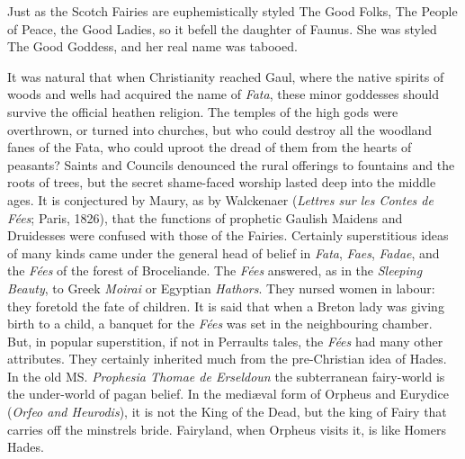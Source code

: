 \documentclass[14pt,a4paper]{memoir}
\begin{document}
{Just as the Scotch Fairies are euphemistically styled
\textquotesingle The Good Folks,\textquotesingle{} \textquotesingle The
People of Peace,\textquotesingle{} the \textquotesingle Good
Ladies,\textquotesingle{} so it befell the daughter of Faunus. She was
styled \textquotesingle The Good Goddess,\textquotesingle{} and her real
name was
tabooed.

It was natural that when Christianity reached Gaul, where the native
spirits of woods and wells had acquired the name of \emph{Fata}, these
minor goddesses should survive the official heathen religion. The
temples of the high gods were overthrown, or turned into churches, but
who could destroy all the woodland fanes of the Fata, who could uproot
the dread of them from the hearts of peasants? Saints and Councils
denounced the rural offerings to fountains and the roots of trees, but
the secret shame-faced worship lasted deep into the middle
ages.
It is conjectured by Maury, as by Walckenaer (\emph{Lettres sur les
Contes de Fées}; Paris, 1826), that the functions of prophetic Gaulish
Maidens and Druidesses were confused with those of the Fairies.
Certainly superstitious ideas of many kinds came under the general head
of belief in \emph{Fata}, \emph{Faes}, \emph{Fadae}, and the \emph{Fées}
of the forest of Broceliande. The \emph{Fées} answered, as in the
\emph{Sleeping Beauty}, to Greek \emph{Moirai} or Egyptian
\emph{Hathors}.
They nursed women in labour: they foretold the fate of children. It is
said that when a Breton lady was giving birth to a child, a banquet for
the \emph{Fées} was set in the neighbouring
chamber.
But, in popular superstition, if not in Perrault\textquotesingle s
tales, the \emph{Fées} had many other attributes. They certainly
inherited much from the pre-Christian idea of Hades. In the old MS.
\emph{Prophesia Thomae de
Erseldoun}
the subterranean fairy-world is the under-world of pagan belief. In the
mediæval form of Orpheus and Eurydice (\emph{Orfeo and Heurodis}), it is
not the King of the Dead, but the king of Fairy that carries off the
minstrel\textquotesingle s bride. Fairyland, when Orpheus visits it, is
like Homer\textquotesingle s Hades.

}
\end{document}
